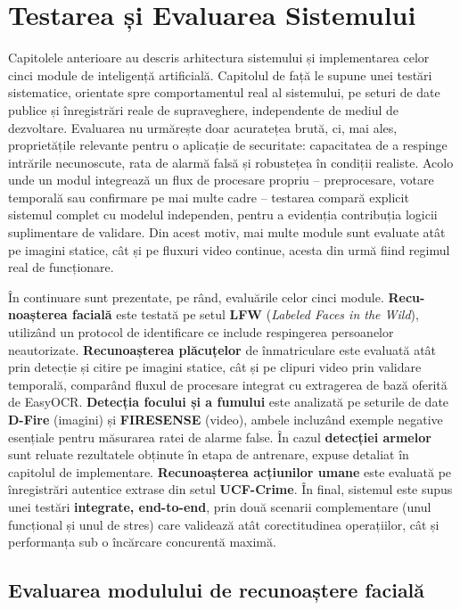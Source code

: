 \documentclass[../../main.tex]{subfiles}
\begin{document}
\chapter{Testarea și Evaluarea Sistemului}
\label{ch:testare}

Capitolele anterioare au descris arhitectura sistemului și implementarea celor cinci module de
inteligență artificială. Capitolul de față le supune unei testări sistematice, orientate spre
comportamentul real al sistemului, pe seturi de date publice și înregistrări reale de supraveghere,
independente de mediul de dezvoltare. Evaluarea nu urmărește doar acuratețea brută, ci, mai ales,
proprietățile relevante pentru o aplicație de securitate: capacitatea de a respinge intrările
necunoscute, rata de alarmă falsă și robustețea în condiții realiste. Acolo unde un modul integrează un flux de procesare propriu -- preprocesare, votare temporală sau confirmare pe mai multe cadre --
testarea compară explicit sistemul complet cu modelul independen, pentru a evidenția contribuția  logicii suplimentare de validare. Din acest motiv, mai multe module sunt evaluate atât pe imagini statice, cât și pe fluxuri video continue, acesta din urmă fiind regimul real de funcționare.

În continuare sunt prezentate, pe rând, evaluările celor cinci module. \textbf{Recu-noașterea facială} este testată pe setul \textbf{LFW} (\textit{Labeled Faces in the Wild}), utilizând un protocol de identificare ce include respingerea persoanelor neautorizate. \textbf{Recunoașterea plăcuțelor} de înmatriculare este evaluată atât prin detecție și citire pe imagini statice, cât și pe clipuri video prin validare temporală, comparând fluxul de procesare integrat cu extragerea de bază oferită de EasyOCR. \textbf{Detecția focului și a fumului} este analizată pe seturile de date \textbf{D-Fire} (imagini) și \textbf{FIRESENSE} (video), ambele incluzând exemple negative esențiale pentru măsurarea ratei de alarme false. În cazul \textbf{detecției armelor} sunt reluate rezultatele obținute în etapa de antrenare, expuse detaliat în capitolul de implementare. \textbf{Recunoașterea acțiunilor umane} este evaluată pe înregistrări autentice extrase din setul \textbf{UCF-Crime}. În final, sistemul este supus unei testări \textbf{integrate, end-to-end}, prin două scenarii complementare (unul funcțional și unul de stres) care validează atât corectitudinea operațiilor, cât și performanța sub o încărcare concurentă maximă.

\section{Evaluarea modulului de recunoaștere facială}
\label{sec:eval_facial}
\end{document}

